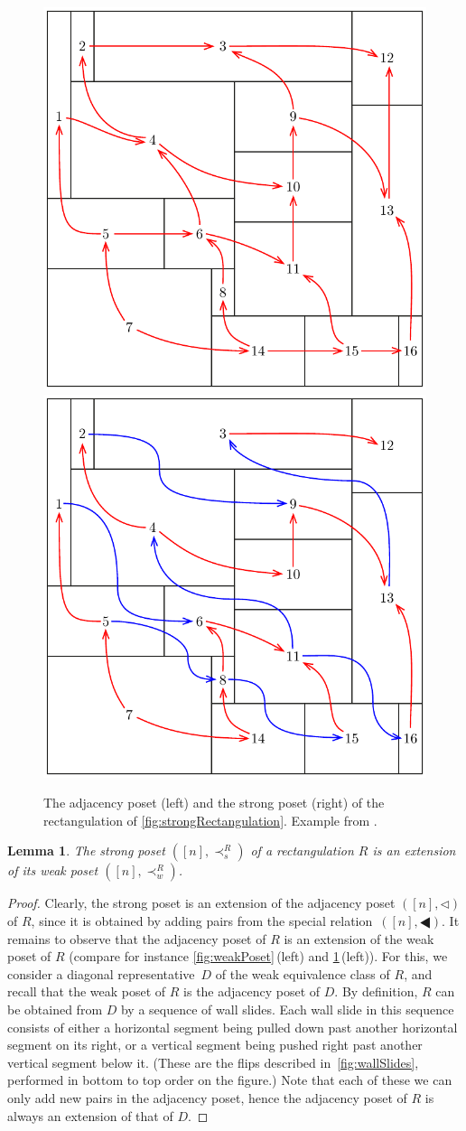 \documentclass{amsart}
\newtheorem{lemma}[theorem]{Lemma}
\theoremstyle{definition}
\newcommand{\tri}{\lhd}
\newcommand{\btri}{\LHD}
\begin{document}
\begin{figure}
	\centerline{\includegraphics[width=.4\textwidth]{adjacencyPoset} \qquad \includegraphics[width=.4\textwidth]{strongPoset}}
	\caption{The adjacency poset (left) and the strong poset (right) of the rectangulation of \cref{fig:strongRectangulation}. Example from \cite{ACFF24}.}
	\label{fig:strongPoset}
\end{figure}

\begin{lemma}
  \label{lem:sextw}
  The strong poset $([n], \prec_s^R)$ of a rectangulation $R$ is an extension of its weak poset $([n], \prec_w^R)$.
\end{lemma}
\begin{proof}
  Clearly, the strong poset is an extension of the adjacency poset $([n],\tri)$ of $R$, since it is obtained by adding pairs from the special relation~$([n],\btri)$.
  It remains to observe that the adjacency poset of $R$ is an extension of the weak poset of $R$ (compare for instance \cref{fig:weakPoset}\,(left) and \cref{fig:strongPoset}\,(left)).
  For this, we consider a diagonal representative~$D$ of the weak equivalence class of $R$, and recall that the weak poset of $R$ is the adjacency poset of $D$.
  By definition, $R$ can be obtained from $D$ by a sequence of wall slides.
  Each wall slide in this sequence consists of either a horizontal segment being pulled down past another horizontal segment on its right, or a vertical segment being pushed right past another vertical segment below it.
  (These are the flips described in~\cref{fig:wallSlides}, performed in bottom to top order on the figure.) 
  Note that each of these we can only add new pairs in the adjacency poset, hence the adjacency poset of $R$ is always an extension of that of $D$. 
\end{proof}
\end{document}
